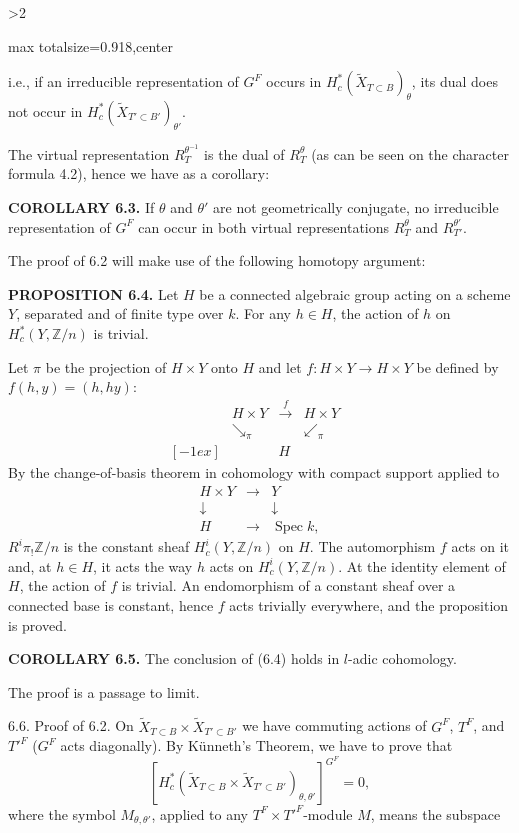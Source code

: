\documentclass[9pt,twoside]{extarticle}
\newcommand{\EditionPage}[3]{%
  \ifnum#1>2\clearpage\fi
  \pdfbookmark[1]{Printed page #2}{en-folio-#2}%
  \hypertarget{en-physical-#1}{}%
  \noindent\begin{adjustbox}{max totalsize={\textwidth}{0.918\textheight},center}
  \begin{minipage}[t]{\textwidth}
  \fontsize{9.4}{11.1}\selectfont\justifying
  #3
  \end{minipage}
  \end{adjustbox}%
}
\begin{document}
\EditionPage{35}{136}{%
i.e., if an irreducible representation of \(G^F\) occurs in \(H_c^*(\widetilde X_{T\subset B})_\theta\), its dual does not occur in \(H_c^*(\widetilde X_{T'\subset B'})_{\theta'}\).\par

The virtual representation \(R_T^{\theta^{-1}}\) is the dual of \(R_T^\theta\) (as can be seen on the character formula 4.2), hence we have as a corollary:\par

\noindent\textbf{COROLLARY 6.3.} If \(\theta\) and \(\theta'\) are not geometrically conjugate, no irreducible representation of \(G^F\) can occur in both virtual representations \(R_T^\theta\) and \(R_{T'}^{\theta'}\).\par

The proof of 6.2 will make use of the following homotopy argument:\par

\noindent\textbf{PROPOSITION 6.4.} Let \(H\) be a connected algebraic group acting on a scheme \(Y\), separated and of finite type over \(k\). For any \(h\in H\), the action of \(h\) on \(H_c^*(Y,\mathbb Z/n)\) is trivial.\par

Let \(\pi\) be the projection of \(H\times Y\) onto \(H\) and let \(f:H\times Y\to H\times Y\) be defined by \(f(h,y)=(h,hy)\): \[
\begin{array}{ccccc}
&H\times Y&\xrightarrow{f}&H\times Y&\\
&\searrow_{\pi}&&\swarrow_{\pi}&\\{}[-1ex]
&&H&&
\end{array}
\] By the change-of-basis theorem in cohomology with compact support applied to \[
\begin{array}{ccc}
H\times Y&\longrightarrow&Y\\
\downarrow&&\downarrow\\
H&\longrightarrow&\operatorname{Spec}k,
\end{array}
\]  \(R^i\pi_!\mathbb Z/n\) is the constant sheaf \(H_c^i(Y,\mathbb Z/n)\) on \(H\). The automorphism \(f\) acts on it and, at \(h\in H\), it acts the way \(h\) acts on \(H_c^i(Y,\mathbb Z/n)\). At the identity element of \(H\), the action of \(f\) is trivial. An endomorphism of a constant sheaf over a connected base is constant, hence \(f\) acts trivially everywhere, and the proposition is proved.\par

\noindent\textbf{COROLLARY 6.5.} The conclusion of (6.4) holds in \(l\)-adic cohomology.\par

The proof is a passage to limit.\par

6.6. Proof of 6.2. On \(\widetilde X_{T\subset B}\times\widetilde X_{T'\subset B'}\) we have commuting actions of \(G^F\), \(T^F\), and \(T'^F\) (\(G^F\) acts diagonally). By Künneth's Theorem, we have to prove that \[
\left[
H_c^*(\widetilde X_{T\subset B}\times\widetilde X_{T'\subset B'})_{\theta,\theta'}
\right]^{G^F}=0,
\] where the symbol \(M_{\theta,\theta'}\), applied to any \(T^F\times T'^F\)-module \(M\), means the subspace\par
}
\end{document}

